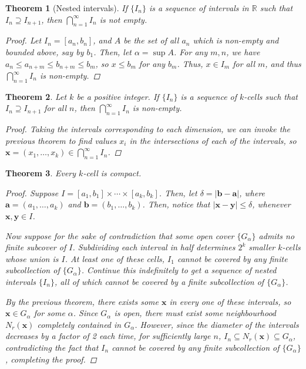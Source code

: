 \documentclass{scrbook}
\newcommand{\R}{\mathbb{R}}
\newtheorem{theorem}{Theorem}
\begin{document}
\begin{theorem}[Nested intervals]
If $\{I_n\}$ is a sequence of intervals in $\R$ such that $I_n \supseteq I_{n+1}$, then $\bigcap_{n=1}^{\infty} I_n$ is not empty.

\begin{proof}
Let $I_n = [a_n, b_n]$, and $A$ be the set of all $a_n$ which is non-empty and bounded above, say by $b_1$. Then, let $\alpha = \sup A$. For any $m, n$, we have $a_n \le a_{n+m} \le b_{n+m} \le b_m$, so $x \le b_m$ for any $b_m$. Thus, $x \in I_m$ for all $m$, and thus $\bigcap_{n=1}^{\infty} I_n$ is non-empty.
\end{proof}
\end{theorem}

\begin{theorem}
Let $k$ be a positive integer. If $\{I_n\}$ is a sequence of $k$-cells such that $I_n \supseteq I_{n+1}$ for all $n$, then $\bigcap_{n=1}^{\infty} I_n$ is non-empty.

\begin{proof}
Taking the intervals corresponding to each dimension, we can invoke the previous theorem to find values $x_i$ in the intersections of each of the intervals, so $\textbf{x} = (x_1, \dotsc, x_k) \in \bigcap_{n=1}^{\infty} I_n$.
\end{proof}
\end{theorem}

\begin{theorem}
Every $k$-cell is compact.

\begin{proof}
Suppose $I = [a_1, b_1] \times \dotsb \times [a_k, b_k]$. Then, let $\delta = \left| \textbf{b} - \textbf{a} \right|$, where $\textbf{a} = (a_1, \dotsc, a_k)$ and $\textbf{b} = (b_1, \dotsc, b_k)$. Then, notice that $|\textbf{x} - \textbf{y}| \le \delta$, whenever $\textbf{x}, \textbf{y} \in I$. 

Now suppose for the sake of contradiction that some open cover $\{G_\alpha\}$ admits no finite subcover of $I$. Subdividing each interval in half determines $2^k$ smaller $k$-cells whose union is $I$. At least one of these cells, $I_1$ cannot be covered by any finite subcollection of $\{G_\alpha\}$. Continue this indefinitely to get a sequence of nested intervals $\{I_n\}$, all of which cannot be covered by a finite subcollection of $\{G_\alpha\}$. 

By the previous theorem, there exists some $\textbf{x}$ in every one of these intervals, so $\textbf{x} \in G_\alpha$ for some $\alpha$. Since $G_\alpha$ is open, there must exist some neighbourhood $N_r(\textbf{x})$ completely contained in $G_\alpha$. However, since the diameter of the intervals decreases by a factor of 2 each time, for sufficiently large $n$, $I_n \subseteq N_r(\textbf{x}) \subseteq G_\alpha$, contradicting the fact that $I_n$ cannot be covered by any finite subcollection of $\{G_\alpha\}$, completing the proof.
\end{proof}
\end{theorem}
\end{document}
